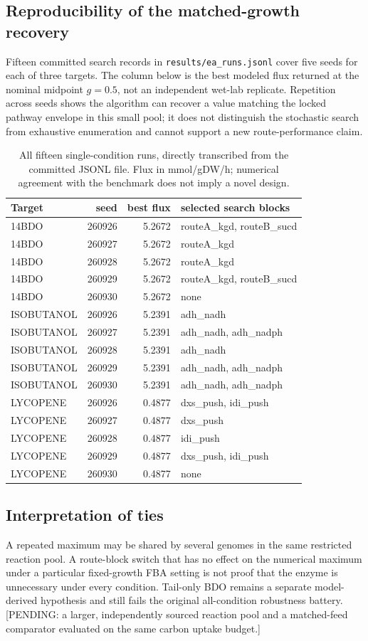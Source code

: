 \subsection{Reproducibility of the matched-growth recovery}
Fifteen committed search records in \texttt{results/ea\_runs.jsonl} cover five seeds for each of three targets. The column below is the best modeled flux returned at the nominal midpoint $g=0.5$, not an independent wet-lab replicate. Repetition across seeds shows the algorithm can recover a value matching the locked pathway envelope in this small pool; it does not distinguish the stochastic search from exhaustive enumeration and cannot support a new route-performance claim.\begin{table}[!htbp]\centering\small\caption{All fifteen single-condition runs, directly transcribed from the committed JSONL file. Flux in mmol/gDW/h; numerical agreement with the benchmark does not imply a novel design.}\begin{tabular}{lrrp{5cm}}\hline Target & seed & best flux & selected search blocks \\\hline
14BDO & 260926 & 5.2672 & routeA\_kgd, routeB\_sucd \\
14BDO & 260927 & 5.2672 & routeA\_kgd \\
14BDO & 260928 & 5.2672 & routeA\_kgd \\
14BDO & 260929 & 5.2672 & routeA\_kgd, routeB\_sucd \\
14BDO & 260930 & 5.2672 & none \\
ISOBUTANOL & 260926 & 5.2391 & adh\_nadh \\
ISOBUTANOL & 260927 & 5.2391 & adh\_nadh, adh\_nadph \\
ISOBUTANOL & 260928 & 5.2391 & adh\_nadh \\
ISOBUTANOL & 260929 & 5.2391 & adh\_nadh, adh\_nadph \\
ISOBUTANOL & 260930 & 5.2391 & adh\_nadh, adh\_nadph \\
LYCOPENE & 260926 & 0.4877 & dxs\_push, idi\_push \\
LYCOPENE & 260927 & 0.4877 & dxs\_push \\
LYCOPENE & 260928 & 0.4877 & idi\_push \\
LYCOPENE & 260929 & 0.4877 & dxs\_push, idi\_push \\
LYCOPENE & 260930 & 0.4877 & none \\
\hline\end{tabular}\end{table}
\subsection{Interpretation of ties}
A repeated maximum may be shared by several genomes in the same restricted reaction pool. A route-block switch that has no effect on the numerical maximum under a particular fixed-growth FBA setting is not proof that the enzyme is unnecessary under every condition. Tail-only BDO remains a separate model-derived hypothesis and still fails the original all-condition robustness battery. [PENDING: a larger, independently sourced reaction pool and a matched-feed comparator evaluated on the same carbon uptake budget.]

